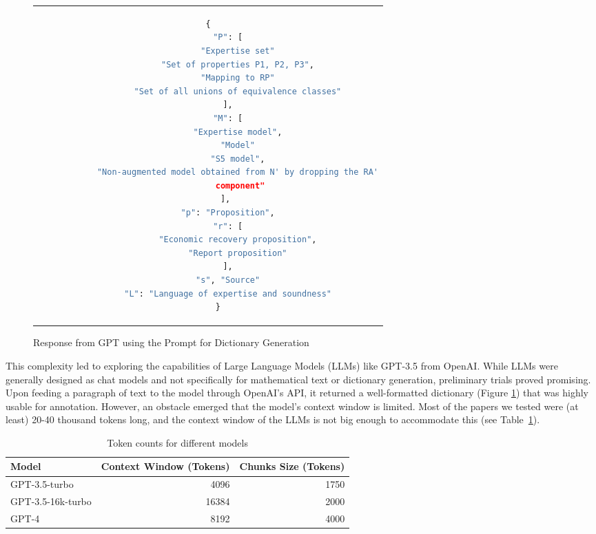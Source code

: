 \begin{figure}[htpb]
  \centering
  \begin{tabular}{c}
  \begin{lstlisting}[language=python]
    {
        "P": [
            "Expertise set"
            "Set of properties P1, P2, P3",
            "Mapping to RP"
            "Set of all unions of equivalence classes"
        ],
        "M": [
            "Expertise model",
            "Model"
            "S5 model",
            "Non-augmented model obtained from N' by dropping the RA'
             component"
        ], 
        "p": "Proposition",
        "r": [
            "Economic recovery proposition",
            "Report proposition"
        ],
        "s", "Source"
        "L": "Language of expertise and soundness"
    }
  \end{lstlisting}
  \end{tabular}
  \caption[Response from Main Prompt for Dictionary Generation]{Response from GPT using the Prompt for Dictionary Generation}\label{fig:dic_response}
\end{figure}

This complexity led to exploring the capabilities of Large Language Models (LLMs) like GPT-3.5 from OpenAI. While LLMs were generally designed as chat models and not specifically for mathematical text or dictionary generation, preliminary trials proved promising. Upon feeding a paragraph of text to the model through OpenAI's API, it returned a well-formatted dictionary (Figure \ref{fig:dic_response}) that was highly usable for annotation. However, an obstacle emerged that the model's context window is limited. Most of the papers we tested were (at least) 20-40 thousand tokens long, and the context window of the LLMs is not big enough to accommodate this (see Table~\ref{tab:token_counts}).

\begin{table}[h]
    \centering
    \begin{tabular}{lrr}
        \hline
        Model & Context Window (Tokens) & Chunks Size (Tokens)\\
        \hline
        GPT-3.5-turbo & 4096 & 1750 \\
        GPT-3.5-16k-turbo & 16384 & 2000 \\
        GPT-4 & 8192 & 4000 \\
        \hline
    \end{tabular}
    \caption{Token counts for different models}
    \label{tab:token_counts}
\end{table}

